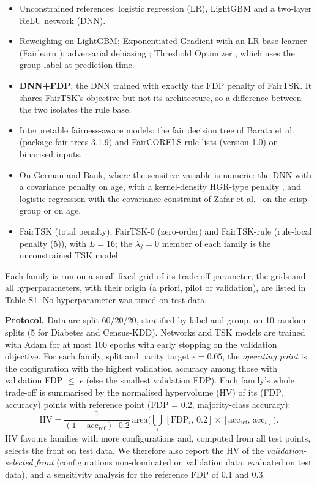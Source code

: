 \documentclass[pdflatex,sn-basic,Numbered,lineno]{sn-jnl}
\providecommand{\tightlist}{\setlength{\itemsep}{0pt}\setlength{\parskip}{0pt}}
\begin{document}
\begin{itemize}
\tightlist
\item
  Unconstrained references: logistic regression (LR), LightGBM \cite{lightgbm} and a two-layer ReLU network (DNN).
\item
  Reweighing \cite{kamiran} on LightGBM; Exponentiated Gradient \cite{agarwal} with an LR base learner (Fairlearn \cite{fairlearn}); adversarial debiasing \cite{zhang}; Threshold Optimizer \cite{hardt}, which uses the group label at prediction time.
\item
  \textbf{DNN+FDP}, the DNN trained with exactly the FDP penalty of FairTSK. It shares FairTSK's objective but not its architecture, so a difference between the two isolates the rule base.
\item
  Interpretable fairness-aware models: the fair decision tree of Barata et al.~\cite{barata} (package fair-trees 3.1.9) and FairCORELS rule lists \cite{aivodji} (version 1.0) on binarised inputs.
\item
  On German and Bank, where the sensitive variable is numeric: the DNN with a covariance penalty on age, with a kernel-density HGR-type penalty \cite{mary}, and logistic regression with the covariance constraint of Zafar et al.~\cite{zafar} on the crisp group or on age.
\item
  FairTSK (total penalty), FairTSK-0 (zero-order) and FairTSK-rule (rule-local penalty (5)), with \(L = 16\); the \(\lambda_f = 0\) member of each family is the unconstrained TSK model.
\end{itemize}

Each family is run on a small fixed grid of its trade-off parameter; the grids and all hyperparameters, with their origin (a priori, pilot or validation), are listed in Table S1. No hyperparameter was tuned on test data.

\textbf{Protocol.} Data are split 60/20/20, stratified by label and group, on 10 random splits (5 for Diabetes and Census-KDD). Networks and TSK models are trained with Adam \cite{adam} for at most 100 epochs with early stopping on the validation objective. For each family, split and parity target \(\epsilon = 0.05\), the \emph{operating point} is the configuration with the highest validation accuracy among those with validation FDP \ensuremath{\le} \(\epsilon\) (else the smallest validation FDP). Each family's whole trade-off is summarised by the normalised hypervolume (HV) \cite{zitzler} of its (FDP, accuracy) points with reference point (FDP = 0.2, majority-class accuracy): \[\mathrm{HV} = \frac{1}{(1 - \text{acc}_{\text{ref}})\cdot 0.2}\ \mathrm{area}\Big(\bigcup_i\,[\text{FDP}_i,\,0.2] \times [\text{acc}_{\text{ref}},\,\text{acc}_i]\Big). \tag{7}\] HV favours families with more configurations and, computed from all test points, selects the front on test data. We therefore also report the HV of the \emph{validation-selected front} (configurations non-dominated on validation data, evaluated on test data), and a sensitivity analysis for the reference FDP of 0.1 and 0.3.
\end{document}

